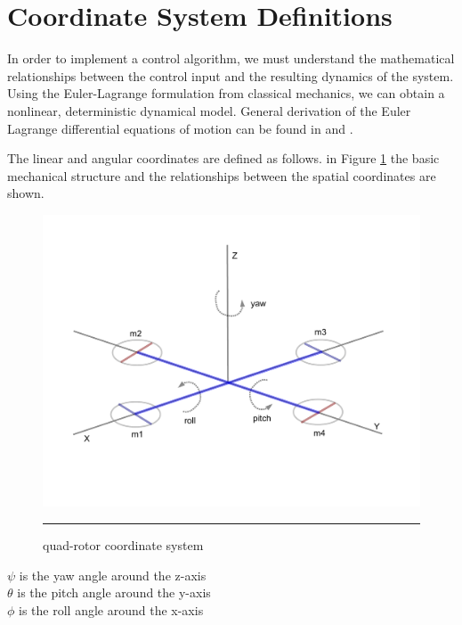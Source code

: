 \section{Coordinate System Definitions}

In order to implement a control algorithm, we must understand the mathematical relationships between the control input and the resulting dynamics of the system. Using the Euler-Lagrange formulation from classical mechanics, we can obtain a nonlinear, deterministic dynamical model. General derivation of the Euler Lagrange differential equations of motion can be found in \cite{marion1995classical} and  \cite{cornelius1970variational}.

 The linear and angular coordinates are defined as follows. in Figure \ref{fig:quad-rotor coordinate system} the basic mechanical structure and the relationships between the spatial coordinates are shown.

\begin{figure}[htbp]
	\centering
		\includegraphics[width=\textwidth]{Figures/coords.pdf}
		\rule{35em}{0.5pt}
	\caption[quad-rotor coordinate system]{quad-rotor coordinate system}
	\label{fig:quad-rotor coordinate system}
\end{figure}


\indent $ \psi $ is the yaw angle around the z-axis\\
\indent $ \theta $ is the pitch angle around the y-axis\\
\indent $ \phi $ is the roll angle around the x-axis\\

